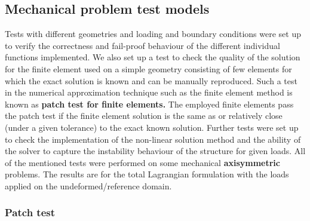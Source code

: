 \documentclass[11pt,a4paper,final]{article}
\begin{document}
\subsection{Mechanical problem test models}
Tests with different geometries and loading and boundary conditions were set up to verify the correctness and fail-proof behaviour of the different individual functions implemented. We also set up a test to check the quality of the solution for the finite element used on a simple geometry consisting of few elements for which the exact solution is known and can be manually reproduced. Such a test in the numerical approximation technique such as the finite element method is known as \textbf{patch test for finite elements.} The employed finite elements pass the patch test if the finite element solution is the same as or relatively close (under a given tolerance) to the exact known solution. Further tests were set up to check the implementation of the non-linear solution method and the ability of the solver to capture the instability behaviour of the structure for given loads. All of the mentioned tests were performed on some mechanical \textbf{axisymmetric} problems. The results are for the total Lagrangian formulation with the loads applied on the undeformed/reference domain. \par 

\subsubsection{Patch test}
\end{document}
